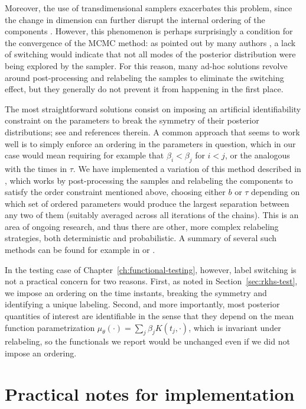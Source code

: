 Moreover, the use of transdimensional samplers exacerbates this problem, since the change in dimension can further disrupt the internal ordering of the components \citep[see][]{roodaki2014relabeling}. However, this phenomenon is perhaps surprisingly a condition for the convergence of the \acs{MCMC} method: as pointed out by many authors \citep[e.g.][]{celeux2000computational}, a lack of switching would indicate that not all modes of the posterior distribution were being explored by the sampler. For this reason, many ad-hoc solutions revolve around post-processing and relabeling the samples to eliminate the switching effect, but they generally do not prevent it from happening in the first place.

The most straightforward solutions consist on imposing an artificial identifiability constraint on the parameters to break the symmetry of their posterior distributions; see \citet{jasra2005markov} and references therein. A common approach that seems to work well is to simply enforce an ordering in the parameters in question, which in our case would mean requiring for example that \(\beta_i < \beta_j\) for \(i < j\), or the analogous with the times in \(\tau\). We have implemented a variation of this method described in \citet{simola2021approximate}, which works by post-processing the samples and relabeling the components to satisfy the order constraint mentioned above, choosing either \(b\) or \(\tau\) depending on which set of ordered parameters would produce the largest separation between any two of them (suitably averaged across all iterations of the chains). This is an area of ongoing research, and thus there are other, more complex relabeling strategies, both deterministic and probabilistic. A summary of several such methods can be found for example in \citet{sperrin2010probabilistic} or \citet{rodriguez2014label}.

In the testing case of Chapter~\ref{ch:functional-testing}, however, label switching is not a practical concern for two reasons. First, as noted in Section~\ref{sec:rkhs-test}, we impose an ordering on the time instants, breaking the symmetry and identifying a unique labeling. Second, and more importantly, most posterior quantities of interest are identifiable in the sense that they depend on the mean function parametrization \(\mu_\theta(\cdot) = \sum_{j} \beta_j K(t_j, \cdot)\), which is invariant under relabeling, so the functionals we report would be unchanged even if we did not impose an ordering.

\section{Practical notes for implementation}

